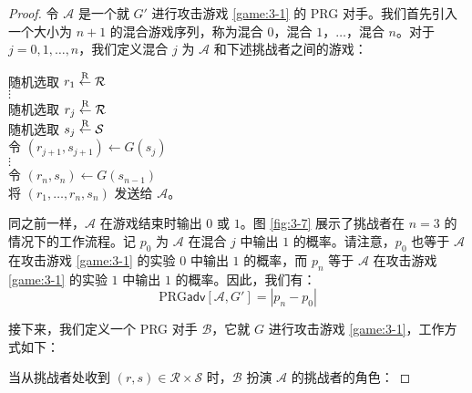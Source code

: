 \begin{proof}
令 $\mathcal A$ 是一个就 $G'$ 进行攻击游戏 \ref{game:3-1} 的 PRG 对手。我们首先引入一个大小为 $n+1$ 的混合游戏序列，称为混合 $0$，混合 $1$，$\dots$，混合 $n$。对于 $j=0,1,\dots,n$，我们定义混合 $j$ 为 $\mathcal A$ 和下述挑战者之间的游戏：

\vspace*{10pt}

\hspace*{5pt} 随机选取 $r_1\overset{\rm R}\leftarrow\mathcal R$\\
\hspace*{50pt} $\vdots$\\
\hspace*{26pt} 随机选取 $r_j\overset{\rm R}\leftarrow\mathcal R$\\
\hspace*{26pt} 随机选取 $s_j\overset{\rm R}\leftarrow\mathcal S$\\
\hspace*{26pt} 令 $(r_{j+1},s_{j+1})\leftarrow G(s_{j})$\\
\hspace*{50pt} $\vdots$\\
\hspace*{26pt} 令 $(r_n,s_{n})\leftarrow G(s_{n-1})$\\
\hspace*{26pt} 将 $(r_1,\dots,r_n,s_n)$ 发送给 $\mathcal A$。

\vspace*{10pt}

\noindent
同之前一样，$\mathcal A$ 在游戏结束时输出 $0$ 或 $1$。图 \ref{fig:3-7} 展示了挑战者在 $n=3$ 的情况下的工作流程。记 $p_0$ 为 $\mathcal A$ 在混合 $j$ 中输出 $1$ 的概率。请注意，$p_0$ 也等于 $\mathcal A$ 在攻击游戏 \ref{game:3-1} 的实验 $0$ 中输出 $1$ 的概率，而 $p_n$ 等于 $\mathcal A$ 在攻击游戏 \ref{game:3-1} 的实验 $1$ 中输出 $1$ 的概率。因此，我们有：
\begin{equation}
\mathrm{PRG}\mathsf{adv}[\mathcal{A},G']
=|p_n-p_0|
\end{equation}

接下来，我们定义一个 PRG 对手 $\mathcal B$，它就 $G$ 进行攻击游戏 \ref{game:3-1}，工作方式如下：

\vspace*{10pt}

\hspace*{5pt} 当从挑战者处收到 $(r,s)\in\mathcal{R}\times\mathcal{S}$ 时，$\mathcal B$ 扮演 $\mathcal A$ 的挑战者的角色：


\end{proof}
